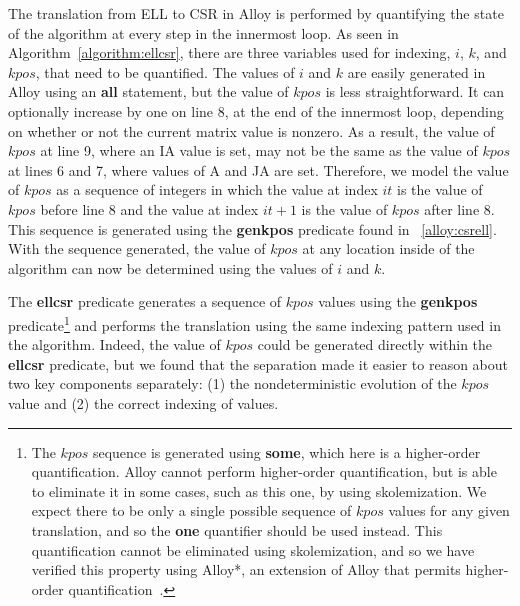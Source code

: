 \documentclass[sigconf]{acmart}
\begin{document}
The translation from ELL to CSR in Alloy is performed by quantifying the state of the algorithm at every step in the innermost loop.  As seen in Algorithm~\ref{algorithm:ellcsr}, there are three variables used for indexing, $i$, $k$, and $kpos$, that need to be quantified.  The values of $i$ and $k$ are easily generated in Alloy using an \textbf{all} statement, but the value of $kpos$ is less straightforward.
It can optionally increase by one on line 8, at the end of the innermost loop, depending on whether or not the current matrix value is nonzero.
As a result, the value of $kpos$ at line 9, where an IA value is set, may not be the same as the value of $kpos$ at lines 6 and 7, where values of A and JA are set.
Therefore, we model the value of $kpos$ as a sequence of integers in which the value at index $it$ is the value of $kpos$ before line 8 and the value at index $it+1$ is the value of $kpos$ after line 8.
This sequence is generated using the \textbf{genkpos} predicate found in \figurename~\ref{alloy:csrell}.  With the sequence generated, the value of $kpos$ at any location inside of the algorithm can now be determined using the values of $i$ and $k$.

The \textbf{ellcsr} predicate generates a sequence of $kpos$ values using the \textbf{genkpos} predicate\footnote{The $kpos$ sequence is generated using \textbf{some}, which here is a higher-order quantification.  Alloy cannot perform higher-order quantification, but is able to eliminate it in some cases, such as this one, by using skolemization.  We expect there to be only a single possible sequence of $kpos$ values for any given translation, and so the \textbf{one} quantifier should be used instead.  This quantification cannot be eliminated using skolemization, and so we have verified this property using Alloy*, an extension of Alloy that permits higher-order quantification~\cite{alloy*}.} and performs the translation using the same indexing pattern used in the algorithm.  Indeed, the value of $kpos$ could be generated directly within the \textbf{ellcsr} predicate, but we found that the separation made it easier to reason about two key components separately: (1) the nondeterministic evolution of the $kpos$ value and (2) the correct indexing of values.
\end{document}
